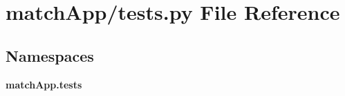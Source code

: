 \section{match\+App/tests.py File Reference}
\label{tests_8py}
\subsection*{Namespaces}
\begin{DoxyCompactItemize}
\item 
 {\bf match\+App.\+tests}
\end{DoxyCompactItemize}
